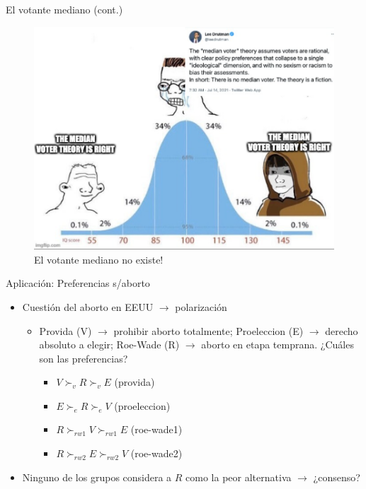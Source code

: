 \documentclass[
  ignorenonframetext,
]{beamer}
\providecommand{\tightlist}{%
  \setlength{\itemsep}{0pt}\setlength{\parskip}{0pt}}\usepackage{longtable,booktabs,array}
\begin{document}
\begin{frame}
\begin{block}{El votante mediano (cont.)}
\begin{figure}
{\centering \includegraphics{../epol/fig/fig-02-mvt-meme.png}

}

\caption{El votante mediano no existe!}

\end{figure}
\end{block}

\begin{block}{Aplicación: Preferencias s/aborto}
\protect\hypertarget{aplicaciuxf3n-preferencias-saborto}{}
\begin{itemize}
\tightlist
\item
  Cuestión del aborto en EEUU \(\longrightarrow\) polarización

  \begin{itemize}
  \tightlist
  \item
    Provida (V) \(\longrightarrow\) prohibir aborto totalmente;
    Proeleccion (E) \(\longrightarrow\) derecho absoluto a elegir;
    Roe-Wade (R) \(\longrightarrow\) aborto en etapa temprana. ¿Cuáles
    son las preferencias?

    \begin{itemize}
    \tightlist
    \item
      \(V \succ_{v} R \succ_{v} E\) (provida)
    \item
      \(E \succ_{e} R \succ_{e} V\) (proeleccion)
    \item
      \(R \succ_{rw1} V \succ_{rw1} E\) (roe-wade1)
    \item
      \(R \succ_{rw2} E \succ_{rw2} V\) (roe-wade2)
    \end{itemize}
  \end{itemize}
\item
  Ninguno de los grupos considera a \(R\) como la peor alternativa
  \(\longrightarrow\) ¿consenso?
\end{itemize}
\end{block}


\end{frame}
\end{document}
